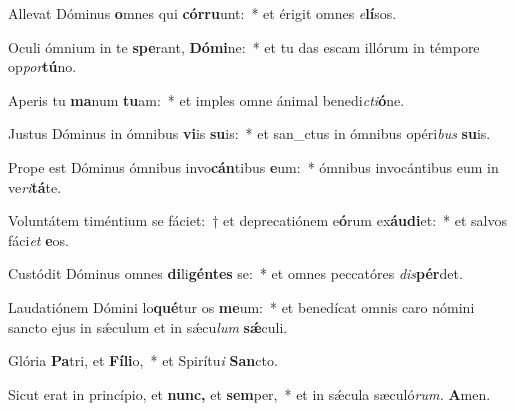 \item Allevat Dóminus \textbf{o}mnes qui \textbf{cór}\textbf{ru}unt:~* et érigit omnes \textit{e}\textbf{lí}sos.
\item Oculi ó\-mnium in te \textbf{spe}rant, \textbf{Dó}\textbf{mi}ne:~* et tu das escam illórum in témpore op\textit{por}\textbf{tú}no.
\item Aperis tu \textbf{ma}num \textbf{tu}am:~* et imples omne ánimal benedi\tinyhspace\textit{cti}\textbf{ó}ne.
\item Justus Dóminus in ómnibus \textbf{vi}is \textbf{su}is:~* et san\_ctus in ómnibus opéri\textit{bus} \textbf{su}is.
\item Prope est Dóminus ómnibus invo\textbf{cán}tibus \textbf{e}um:~* ómnibus invocántibus eum in ve\tinyhspace\textit{ri}\textbf{tá}te.
\item Voluntátem timéntium se fáciet:~† et deprecatiónem e\textbf{ó}rum ex\textbf{áu}\textbf{di}et:~* et salvos fáci\tinyhspace\textit{et} \textbf{e}os.
\item Custódit Dóminus omnes \textbf{di}li\textbf{gén}\textbf{tes} se:~* et omnes peccatóres \textit{dis}\textbf{pér}det.
\item Laudatiónem Dómini lo\textbf{qué}tur os \textbf{me}um:~* et benedícat omnis caro nómini sancto ejus in sǽculum et in sǽcu\tinyhspace\textit{lum} \textbf{sǽ}culi.
\item Glória \textbf{Pa}tri, et \textbf{Fí}\textbf{li}o,~* et Spirítu\textit{i} \textbf{San}cto.
\item Sicut erat in princípio, et \textbf{nunc,} et \textbf{sem}per,~* et in sǽcula sæculó\textit{rum.} \textbf{A}men.